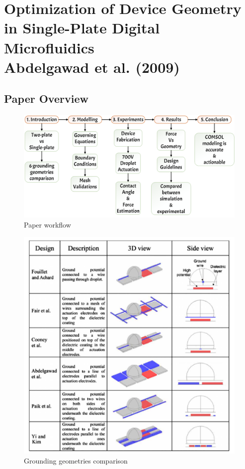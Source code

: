 \chapter[Optimization of Device Geometry in Single-Plate DMF\\{\normalfont Abdelgawad et al. (2009)}]%
{Optimization of Device Geometry in Single-Plate Digital Microfluidics\\[1ex]{\normalfont Abdelgawad et al. (2009)}}

\section{Paper Overview}
\begin{figure}[h!]
    \centering
    \includegraphics[width=\textwidth]{Figures/Abdelgawad_2019_Overview.png}
    \caption{Paper workflow}
\end{figure}

\begin{figure}[h!]
    \centering
    \includegraphics[width=\textwidth]{Figures/Comparison.png}
    \caption{Grounding geometries comparison}
\end{figure}